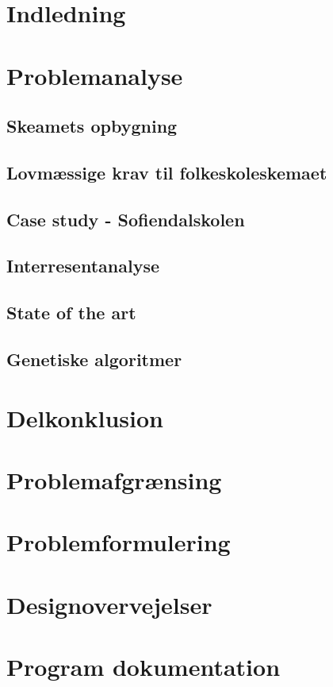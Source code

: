 \section{Indledning}
  

\section{Problemanalyse}
  

  \subsection{Skeamets opbygning}
    

  \subsection{Lovmæssige krav til folkeskoleskemaet}
    

  \subsection{Case study - Sofiendalskolen}
    

  \subsection{Interresentanalyse}
    

  \subsection{State of the art}
    

  \subsection {Genetiske algoritmer}
    

\section{Delkonklusion}
  

\section{Problemafgrænsing}
  

\section{Problemformulering}
  

\section{Designovervejelser}
  

\section{Program dokumentation}
  